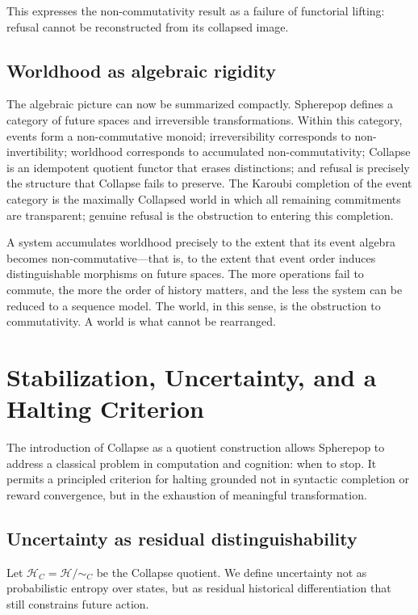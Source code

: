\documentclass[11pt]{article}
\begin{document}
This expresses the non-commutativity result as a failure of functorial lifting:
refusal cannot be reconstructed from its collapsed image.

\subsection{Worldhood as algebraic rigidity}

The algebraic picture can now be summarized compactly. Spherepop defines a
category of future spaces and irreversible transformations. Within this category,
events form a non-commutative monoid; irreversibility corresponds to
non-invertibility; worldhood corresponds to accumulated non-commutativity;
Collapse is an idempotent quotient functor that erases distinctions; and refusal
is precisely the structure that Collapse fails to preserve. The Karoubi
completion of the event category is the maximally Collapsed world in which all
remaining commitments are transparent; genuine refusal is the obstruction to
entering this completion.

A system accumulates worldhood precisely to the extent that its event algebra
becomes non-commutative---that is, to the extent that event order induces
distinguishable morphisms on future spaces. The more operations fail to commute,
the more the order of history matters, and the less the system can be reduced to
a sequence model. The world, in this sense, is the obstruction to commutativity.
A world is what cannot be rearranged.

\section{Stabilization, Uncertainty, and a Halting Criterion}

The introduction of Collapse as a quotient construction allows Spherepop to
address a classical problem in computation and cognition: when to stop. It
permits a principled criterion for halting grounded not in syntactic completion
or reward convergence, but in the exhaustion of meaningful transformation.

\subsection{Uncertainty as residual distinguishability}

Let $\mathcal{H}_C = \mathcal{H}/\sim_C$ be the Collapse quotient. We define
uncertainty not as probabilistic entropy over states, but as residual historical
differentiation that still constrains future action.
\end{document}
